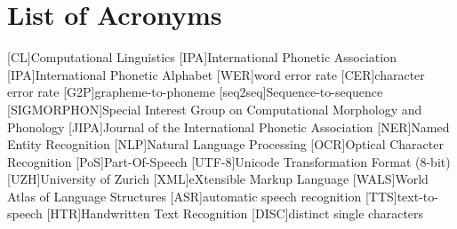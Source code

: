 {}
\chapter*{List of Acronyms}
\begin{acronym}[WER]\itemsep3pt
[CL]{Computational Linguistics}
[IPA]{International Phonetic Association}
[IPA]{International Phonetic Alphabet}
[WER]{word error rate}
[CER]{character error rate}
[G2P]{grapheme-to-phoneme} 
[seq2seq]{Sequence-to-sequence} 
[SIGMORPHON]{Special Interest Group on Computational  Morphology and Phonology}
[JIPA]{Journal of the International Phonetic Association}
[NER]{Named Entity Recognition}
[NLP]{Natural Language Processing}
[OCR]{Optical Character Recognition}
[PoS]{Part-Of-Speech}
[UTF-8]{Unicode Transformation Format (8-bit)}
[UZH]{University of Zurich}
[XML]{eXtensible Markup Language}
[WALS]{World Atlas of Language Structures}
[ASR]{automatic speech recognition}
[TTS]{text-to-speech}
[HTR]{Handwritten Text Recognition}
[DISC]{distinct single characters}
\end{acronym}